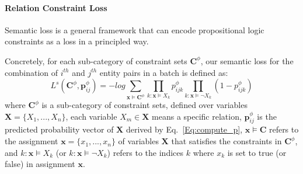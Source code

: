 \paragraph{Relation Constraint Loss}
Semantic loss is a general framework that can encode propositional logic constraints as a loss in a principled way.

Concretely, for each sub-category of constraint sets $\bm{C}^{\phi}$, our semantic loss for the combination of $i^{th}$ and $j^{th}$ entity pairs in a batch is defined as:
\begin{equation}
\label{seq:semantic_loss}
	L^{s}(\bm{C}^{\phi}, \bm{p}^{\phi}_{ij}) = -log\sum\limits_{\bm x\models\bm{C}^{\phi}}\prod\limits_{k:\bm x\models X_k}p^{\phi}_{ijk}\prod\limits_{k:\bm x\models \neg X_k}(1-p^{\phi}_{ijk})
\end{equation}
where $\bm{C}^{\phi}$ is a sub-category of constraint sets, defined over variables $\bm{X}=\{X_1,...,X_n\}$,
each variable $X_m \in \bm{X}$ means a specific relation, 
$\bm{p}^{\phi}_{ij}$ is the predicted probability vector of $\bm{X}$ derived by Eq.~\ref{Eq:compute_p},
$\bm x \models \bm{C}$ refers to the assignment $\bm{x} = \{x_1,...,x_n\}$ of variables $\bm X$ that satisfies the constraints in $\bm{C}^{\phi}$,
and $k\colon\bm x \models X_k$ (or $k\colon\bm x\models \neg X_k$) refers to the indices $k$ where $x_k$ is set to true (or false) in assignment $\bm x$.
